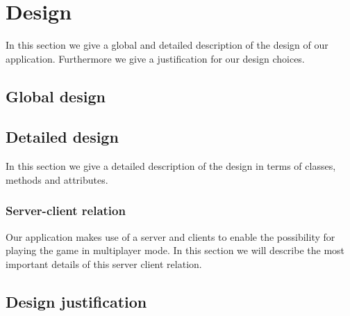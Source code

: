 \documentclass[../main.tex]{subfiles}
\begin{document}
\pagebreak
\section{Design}
In this section we give a global and detailed description of the design of our application. Furthermore we give a justification for our design choices.

    \subsection{Global design}

    \subsection{Detailed design}
    In this section we give a detailed description of the design in terms of classes, methods and attributes.

        \subsubsection{Server-client relation}
        Our application makes use of a server and clients to enable the possibility for playing the game in multiplayer mode. In this section we will describe the most important details of this server client relation.



    \subsection{Design justification}
\end{document}
